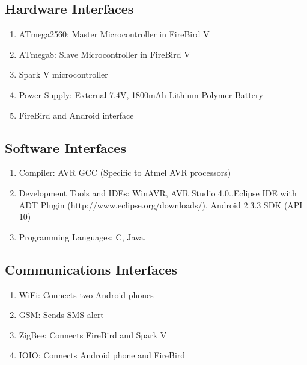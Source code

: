 \documentclass[a4paper, 12pt]{article}
\begin{document}
\subsection{Hardware Interfaces}
\begin{enumerate}
 \item ATmega2560: Master Microcontroller in FireBird V
 \item ATmega8: Slave Microcontroller in FireBird V
 \item Spark V microcontroller
 \item Power Supply: External 7.4V, 1800mAh Lithium Polymer Battery
 \item FireBird and Android interface
\end{enumerate}

\subsection{Software Interfaces}
\begin{enumerate}
 \item Compiler: AVR GCC (Specific to Atmel AVR processors)
 \item Development Tools and IDEs: WinAVR, AVR Studio 4.0.,Eclipse IDE with ADT Plugin
 (http://www.eclipse.org/downloads/), Android 2.3.3 SDK (API 10) \cite{adr}
 \item Programming Languages: C, Java.
\end{enumerate}

\subsection{Communications Interfaces}
\begin{enumerate}
 \item WiFi: Connects two Android phones
 \item GSM: Sends SMS alert
 \item ZigBee: Connects FireBird and Spark V
 \item IOIO: Connects Android phone and FireBird
\end{enumerate}
\end{document}
